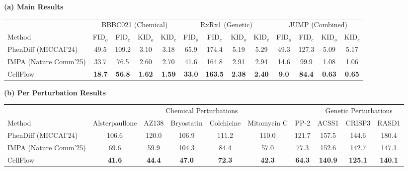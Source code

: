 \begin{table*}[!tb]
    \small
    \centering
    \setlength\tabcolsep{6pt}
    \renewcommand{\arraystretch}{1.1}
    
    \textbf{(a) Main Results} \\
    \begin{tabular}{lcccccccccccc}
    \toprule
    & \multicolumn{4}{c}{BBBC021 (Chemical)} & \multicolumn{4}{c}{RxRx1 (Genetic)} & \multicolumn{4}{c}{JUMP (Combined)} \\
    Method & FID$_o$ & FID$_c$ & KID$_o$ & KID$_c$ & FID$_o$ & FID$_c$ & KID$_o$ & KID$_c$ & FID$_o$ & FID$_c$ & KID$_o$ & KID$_c$ \\
    \midrule
    PhenDiff (MICCAI'24) & 49.5 & 109.2 & 3.10 & 3.18 & 65.9 & 174.4 & 5.19 & 5.29 & 49.3 & 127.3 & 5.09 & 5.17\\
    IMPA (Nature Comm'25) & 33.7 & 76.5 & 2.60 & 2.70 & 41.6 & 164.8 & 2.91 & 2.94 & 14.6 & 99.9 & 1.08 & 1.06\\
    CellFlow & \textbf{18.7} & \textbf{56.8} & \textbf{1.62} & \textbf{1.59} & \textbf{33.0} & \textbf{163.5} & \textbf{2.38} & \textbf{2.40} & \textbf{9.0} & \textbf{84.4} & \textbf{0.63} & \textbf{0.65}\\
    \bottomrule
    \end{tabular}
    \vspace{0.3em}

    \setlength\tabcolsep{4pt}
    \renewcommand{\arraystretch}{1.1}
    
    \textbf{(b) Per Perturbation Results} \\
    \begin{tabular}{lccccccccc}
    \toprule
    & \multicolumn{6}{c}{Chemical Perturbations} & \multicolumn{3}{c}{Genetic Perturbations} \\
    Method & Alsterpaullone & AZ138 & Bryostatin & Colchicine & Mitomycin C & PP-2 & ACSS1 & CRISP3 & RASD1 \\
    \midrule    
    PhenDiff (MICCAI'24) & 106.6 & 120.0 & 106.9 & 111.2 & 110.0 & 121.7 & 157.5 & 144.6 & 180.4\\
    IMPA (Nature Comm'25) & 69.6 & 59.9 & 104.3 & 84.4 & 57.0 & 77.3 & 152.6 & 142.7 & 147.1\\
    CellFlow & \textbf{41.6} & \textbf{44.4} & \textbf{47.0} & \textbf{72.3} & \textbf{42.3} & \textbf{64.3} & \textbf{140.9} & \textbf{125.1} & \textbf{140.1}\\
    \bottomrule
    \end{tabular}
    \vspace{-1em}
    

\end{table*}
